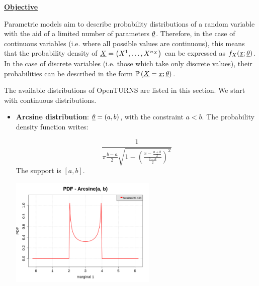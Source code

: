 

\renewcommand{\etapemethodo}{B}
\renewcommand{\nomfichier}{docref_B121_DistributionSelection}
\renewcommand{\titrefiche}{Standard parametric models}

\Header

\MathematicalDescription
{

\underline{\textbf{Objective}} \vspace{2mm}

Parametric models aim to describe probability distributions of a random variable with the aid of a limited number of parameters ${\underline{\theta}}$. Therefore, in the case of continuous variables (i.e. where all possible values are continuous), this means that the probability density of ${\underline{X}} = \left( X^1,\ldots,X^{n_X} \right)$ can be expressed as $f_X({\underline{x}};{\underline{\theta}})$. In the case of discrete variables (i.e. those which take only discrete values), their probabilities can be described in the form ${\mathbb P}\left( {\underline{X}} = {\underline{x}};{\underline{\theta}} \right)$.
\vspace{2mm}

The available distributions of OpenTURNS are listed in this section. We start with continuous distributions.

\begin{itemize}
\item {\bf Arcsine distribution}: ${\underline{\theta}} = \left(a,b \right)$, with the constraint $a<b$. The probability density function writes:

\begin{equation}
\frac{ 1 }{ \pi\frac{b-a}{2} \sqrt{1-\left(\frac{
x-\frac{a+b}{2} }{\frac{b-a}{2} }\right)^{2}} }
\end{equation}
The support is $[a,b]$.

\begin{center}
\includegraphics[width=7cm]{Figures/pdf_Arcsine.png}
\end{center}


\end{itemize}}

